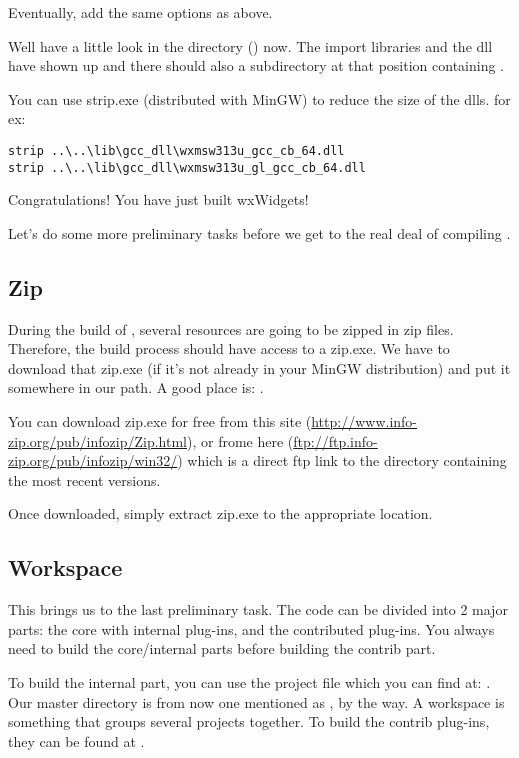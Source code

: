 Eventually, add the same options as above.

Well have a little look in the directory () now. The import libraries and the dll have shown up and there should also a  subdirectory at that position containing .

You can use strip.exe (distributed with MinGW) to reduce the size of the dlls.
for ex:
\begin{verbatim}
strip ..\..\lib\gcc_dll\wxmsw313u_gcc_cb_64.dll
strip ..\..\lib\gcc_dll\wxmsw313u_gl_gcc_cb_64.dll
\end{verbatim}

Congratulations! You have just built wxWidgets!

Let's do some more preliminary tasks before we get to the real deal of compiling \codeblocks.

\subsection{Zip}

During the build of \codeblocks, several resources are going to be zipped in zip files. Therefore, the build process should have access to a zip.exe. We have to download that zip.exe (if it's not already in your MinGW distribution) and put it somewhere in our path. A good place is: .

You can download zip.exe for free from this site (\url{http://www.info-zip.org/pub/infozip/Zip.html}), or frome here (\url{ftp://ftp.info-zip.org/pub/infozip/win32/}) which is a direct ftp link to the directory containing the most recent versions.

Once downloaded, simply extract zip.exe to the appropriate location.

\subsection{Workspace}
This brings us to the last preliminary task. The \codeblocks code can be divided into 2 major parts: the core with internal plug-ins, and the contributed plug-ins. You always need to build the core/internal parts before building the contrib part.

To build the internal part, you can use the \codeblocks project file which you can find at: . Our \codeblocks master directory is from now one mentioned as , by the way. A workspace is something that groups several projects together. To build the contrib plug-ins, they can be found at .

